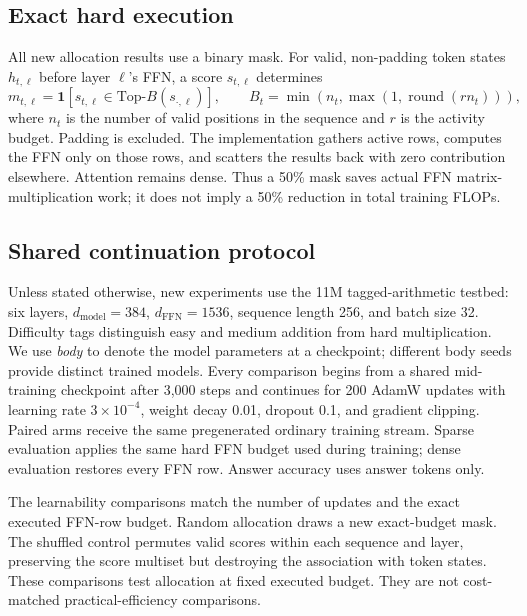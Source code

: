 \documentclass{article}
\newcommand{\TopB}{\mathrm{Top}\text{-}B}
\begin{document}
\subsection{Exact hard execution}
All new allocation results use a binary mask. For valid, non-padding token
states $h_{t,\ell}$ before layer $\ell$'s FFN, a score $s_{t,\ell}$ determines
\begin{equation}
m_{t,\ell}=\mathbf{1}\!\left[s_{t,\ell}\in\TopB(s_{\cdot,\ell})\right],
\qquad
B_t=\min\!\left(n_t,\max\!\left(1,\operatorname{round}(r n_t)\right)\right),
\label{eq:hardmask}
\end{equation}
where $n_t$ is the number of valid positions in the sequence and $r$ is the
activity budget. Padding is excluded. The implementation gathers active rows,
computes the FFN only on those rows, and scatters the results back with zero
contribution elsewhere. Attention remains dense. Thus a 50\% mask saves actual
FFN matrix-multiplication work; it does not imply a 50\% reduction in total
training FLOPs.

\subsection{Shared continuation protocol}
\label{sec:protocol}
Unless stated otherwise, new experiments use the 11M tagged-arithmetic testbed:
six layers, $d_{\mathrm{model}}=384$, $d_{\mathrm{FFN}}=1536$, sequence length
256, and batch size 32. Difficulty tags distinguish easy and medium addition
from hard multiplication. We use \emph{body} to denote the model parameters at
a checkpoint; different body seeds provide distinct trained models. Every
comparison begins from a shared mid-training checkpoint after 3{,}000 steps and
continues for 200 AdamW updates with learning rate $3\times10^{-4}$, weight
decay 0.01, dropout 0.1, and gradient clipping. Paired arms receive the same
pregenerated ordinary training stream. Sparse evaluation applies the same hard
FFN budget used during training; dense evaluation restores every FFN row.
Answer accuracy uses answer tokens only.

The learnability comparisons match the number of updates and the exact executed
FFN-row budget. Random allocation draws a new exact-budget mask. The shuffled
control permutes valid scores within each sequence and layer, preserving the
score multiset but destroying the association with token states. These
comparisons test allocation at fixed executed budget. They are not
cost-matched practical-efficiency comparisons.
\end{document}
